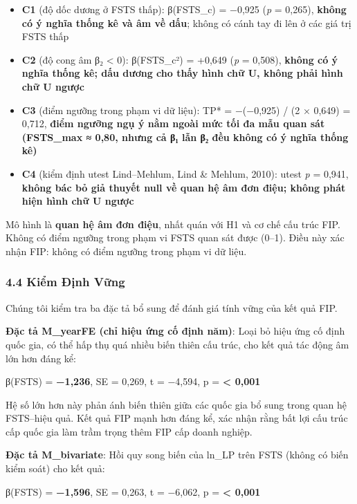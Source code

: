 \documentclass[12pt,a4paper]{article}
\providecommand{\tightlist}{\setlength{\itemsep}{0pt}\setlength{\parskip}{0pt}}
\begin{document}
\begin{itemize}
\tightlist
\item
  \textbf{C1} (độ dốc dương ở FSTS thấp): β(FSTS\_c) = −0,925 (\emph{p}
  = 0,265), \textbf{không có ý nghĩa thống kê và âm về dấu}; không có
  cánh tay đi lên ở các giá trị FSTS thấp
\item
  \textbf{C2} (độ cong âm β₂ \textless{} 0): β(FSTS\_c²) = +0,649
  (\emph{p} = 0,508), \textbf{không có ý nghĩa thống kê; dấu dương cho
  thấy hình chữ U, không phải hình chữ U ngược}
\item
  \textbf{C3} (điểm ngưỡng trong phạm vi dữ liệu): TP* = −(−0,925) / (2
  × 0,649) = 0,712, \textbf{điểm ngưỡng ngụ ý nằm ngoài mức tối đa mẫu
  quan sát (FSTS\_max ≈ 0,80, nhưng cả β₁ lẫn β₂ đều không có ý nghĩa
  thống kê)}
\item
  \textbf{C4} (kiểm định utest Lind--Mehlum, Lind \& Mehlum, 2010):
  utest \emph{p} = 0,941, \textbf{không bác bỏ giả thuyết null về quan
  hệ âm đơn điệu; không phát hiện hình chữ U ngược}
\end{itemize}

Mô hình là \textbf{quan hệ âm đơn điệu}, nhất quán với H1 và cơ chế cấu
trúc FIP. Không có điểm ngưỡng trong phạm vi FSTS quan sát được (0--1).
Điều này xác nhận FIP: không có điểm ngưỡng trong phạm vi dữ liệu.

\hypertarget{44-kiux1ec3m-ux111ux1ecbnh-vux1eefng}{%
\subsubsection{4.4 Kiểm Định
Vững}\label{44-kiux1ec3m-ux111ux1ecbnh-vux1eefng}}

Chúng tôi kiểm tra ba đặc tả bổ sung để đánh giá tính vững của kết quả
FIP.

\textbf{Đặc tả M\_yearFE (chỉ hiệu ứng cố định năm)}: Loại bỏ hiệu ứng
cố định quốc gia, có thể hấp thụ quá nhiều biến thiên cấu trúc, cho kết
quả tác động âm lớn hơn đáng kể:

β(FSTS) = \textbf{−1,236}, SE = 0,269, t = −4,594, p =
\textbf{\textless{} 0,001}

Hệ số lớn hơn này phản ánh biến thiên giữa các quốc gia bổ sung trong
quan hệ FSTS--hiệu quả. Kết quả FIP mạnh hơn đáng kể, xác nhận rằng bất
lợi cấu trúc cấp quốc gia làm trầm trọng thêm FIP cấp doanh nghiệp.

\textbf{Đặc tả M\_bivariate}: Hồi quy song biến của ln\_LP trên FSTS
(không có biến kiểm soát) cho kết quả:

β(FSTS) = \textbf{−1,596}, SE = 0,263, t = −6,062, p =
\textbf{\textless{} 0,001}
\end{document}
